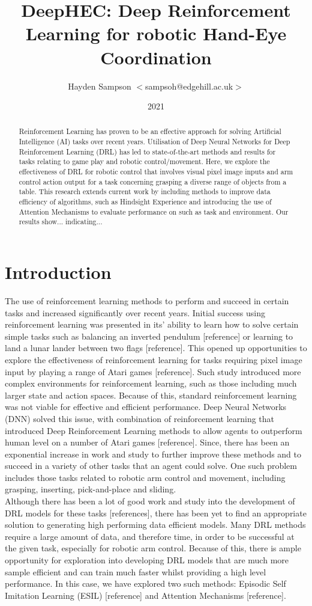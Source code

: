 \documentclass{article}
\title{DeepHEC: Deep Reinforcement Learning for robotic Hand-Eye Coordination}
\author{Hayden Sampson $<$sampsoh@edgehill.ac.uk$>$}
\date{2021}
\begin{document}
\maketitle

\begin{abstract}
Reinforcement Learning has proven to be an effective approach for solving 	Artificial Intelligence (AI) tasks over recent years. Utilisation of Deep Neural Networks for Deep Reinforcement Learning (DRL) has led to state-of-the-art methods and results for tasks relating to game play and robotic control/movement. Here, we explore the effectiveness of DRL for robotic control that involves visual pixel image inputs and arm control action output for a task concerning grasping a diverse range of objects from a table. This research extends current work by including methods to improve data efficiency of algorithms, such as Hindsight Experience and introducing the use of Attention Mechanisms to evaluate performance on such as task and environment. Our results show... indicating...
\end{abstract}
\section{Introduction}
The use of reinforcement learning methods to perform and succeed in certain tasks and increased significantly over recent years. Initial success using reinforcement learning was presented in its' ability to learn how to solve certain simple tasks such as balancing an inverted pendulum [reference] or learning to land a lunar lander between two flags [reference]. This opened up opportunities to explore the effectiveness of reinforcement learning for tasks requiring pixel image input by playing a range of Atari games [reference]. Such study introduced more complex environments for reinforcement learning, such as those including much larger state and action spaces. Because of this, standard reinforcement learning was not viable for effective and efficient performance. Deep Neural Networks (DNN) solved this issue, with combination of reinforcement learning that introduced Deep Reinforcement Learning methods to allow agents to outperform human level on a number of Atari games [reference]. Since, there has been an exponential increase in work and study to further improve these methods and to succeed in a variety of other tasks that an agent could solve. One such problem includes those tasks related to robotic arm control and movement, including grasping, inserting, pick-and-place and sliding.
\\
Although there has been a lot of good work and study into the development of DRL models for these tasks [references], there has been yet to find an appropriate solution to generating high performing data efficient models. Many DRL methods require a large amount of data, and therefore time, in order to be successful at the given task, especially for robotic arm control. Because of this, there is ample opportunity for exploration into developing DRL models that are much more sample efficient and can train much faster whilst providing a high level performance. In this case, we have explored two such methods: Episodic Self Imitation Learning (ESIL) [reference] and Attention Mechanisms [reference].
\end{document}
